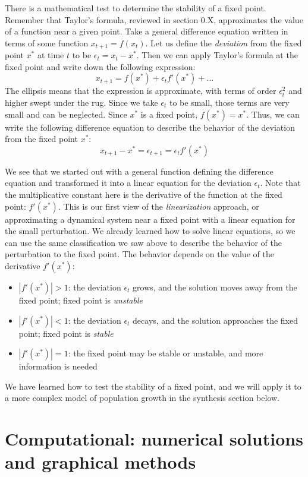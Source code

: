 \documentclass[11pt]{book}
\begin{document}
There is a mathematical test to determine the stability of a fixed point. Remember that Taylor's formula, reviewed in section 0.X, approximates the value of a function near a given point. Take a general difference equation written in terms of some function $x_{t+1} = f(x_t)$.  Let us define the \emph{deviation} from the fixed point $x^*$ at time $t$ to be $\epsilon_t = x_{t} - x^*$. Then we can apply Taylor's formula at the fixed point and write down the following expression:
$$ x_{t+1} = f(x^*) + \epsilon_t f'(x^*) + ...$$
The ellipsis means that the expression is approximate, with terms of order $\epsilon_t^2$ and higher swept under the rug. Since we take $ \epsilon_t$ to be small, those terms are very small and can be neglected. Since $x^*$ is a fixed point, $ f(x^*) = x^*$. Thus, we can write the following difference equation to describe the behavior of the deviation from the fixed point $x^*$:
$$ x_{t+1} -  x^* =  \epsilon_{t+1}= \epsilon_t f'(x^*) $$

We see that we started out with a general function defining the difference equation and transformed it into a linear equation for the deviation $\epsilon_t$. Note that the multiplicative constant here is the derivative of the function at the fixed point: $f'(x^*)$. This is our first view of the \emph{linearization} approach, or  approximating a dynamical system near a fixed point with a linear equation for the small perturbation. We already learned how to solve linear equations, so we can use the same classification we saw above to describe the behavior of the perturbation to the fixed point. The behavior depends on the value of the derivative $f'(x^*)$:
\begin{itemize}
\item $|f'(x^*)| > 1$: the deviation $\epsilon_t$ grows, and the solution moves away from the fixed point; fixed point is \emph{unstable}
\item $|f'(x^*)| < 1$: the deviation $\epsilon_t$ decays, and the solution approaches the fixed point; fixed point is \emph{stable}
\item $|f'(x^*)| = 1 $: the fixed point may be stable or unstable, and more information is needed
\end{itemize}
We have learned how to test the stability of a fixed point, and we will apply it to a more complex model of population growth in the synthesis section below.

\section[Numerical solutions of difference equations]{Computational: numerical solutions and graphical methods}
\end{document}
